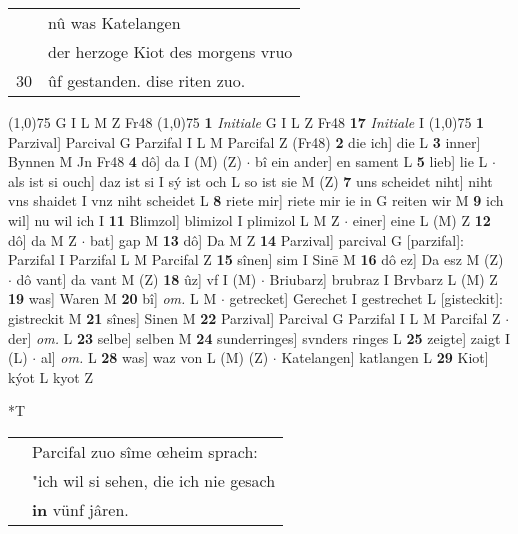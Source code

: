 \documentclass[8pt,a4paper,notitlepage]{article}
\begin{document}
\begin{table}[ht]
\begin{minipage}[t]{0.5\linewidth}
\begin{tabular}{rl}
 & nû was  Katelangen\\ 
 & der herzoge Kiot des morgens vruo\\ 
30 & ûf gestanden. dise riten zuo.\\ 
\end{tabular}
\scriptsize
\line(1,0){75} \newline
G I L M Z Fr48 \newline
\line(1,0){75} \newline
\textbf{1} \textit{Initiale} G I L Z Fr48  \textbf{17} \textit{Initiale} I  \newline
\line(1,0){75} \newline
\textbf{1} Parzival] Parcival G Parzifal I L M Parcifal Z (Fr48) \textbf{2} die ich] die L \textbf{3} inner] Bynnen M Jn Fr48 \textbf{4} dô] da I (M) (Z)  $\cdot$ bî ein ander] en sament L \textbf{5} lieb] lie L  $\cdot$ als ist si ouch] daz ist si I sý ist och L so ist sie M (Z) \textbf{7} uns scheidet niht] niht vns shaidet I vnz niht scheidet L \textbf{8} riete mir] riete mir ie in G reiten wir M \textbf{9} ich wil] nu wil ich I \textbf{11} Blimzol] blimizol I plimizol L M Z  $\cdot$ einer] eine L (M) Z \textbf{12} dô] da M Z  $\cdot$ bat] gap M \textbf{13} dô] Da M Z \textbf{14} Parzival] parcival G [parzifal]: Parzifal I Parzifal L M Parcifal Z \textbf{15} sînen] sim I Sinē M \textbf{16} dô ez] Da esz M (Z)  $\cdot$ dô vant] da vant M (Z) \textbf{18} ûz] vf I (M)  $\cdot$ Briubarz] brubraz I Brvbarz L (M) Z \textbf{19} was] Waren M \textbf{20} bî] \textit{om.} L M  $\cdot$ getrecket] Gerechet I gestrechet L [gisteckit]: gistreckit M \textbf{21} sînes] Sinen M \textbf{22} Parzival] Parcival G Parzifal I L M Parcifal Z  $\cdot$ der] \textit{om.} L \textbf{23} selbe] selben M \textbf{24} sunderringes] svnders ringes L \textbf{25} zeigte] zaigt I (L)  $\cdot$ al] \textit{om.} L \textbf{28} was] waz von L (M) (Z)  $\cdot$ Katelangen] katlangen L \textbf{29} Kiot] kýot L kyot Z \newline
\end{minipage}
\hspace{0.5cm}
\begin{minipage}[t]{0.5\linewidth}
\small
\begin{center}*T
\end{center}
\begin{tabular}{rl}
 & Parcifal zuo sîme œheim sprach:\\ 
 & "ich wil si sehen, die ich nie gesach\\ 
 & \textbf{in} vünf jâren.\\ 

\end{tabular}
\end{minipage}
\end{table}
\end{document}
